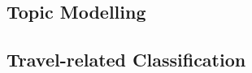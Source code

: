 \documentclass[9pt,a4paper]{extarticle}
\begin{document}
\begin{multicols}{2}
\subsection{Topic Modelling}

\subsection{Travel-related Classification}











\end{multicols}
\end{document}
